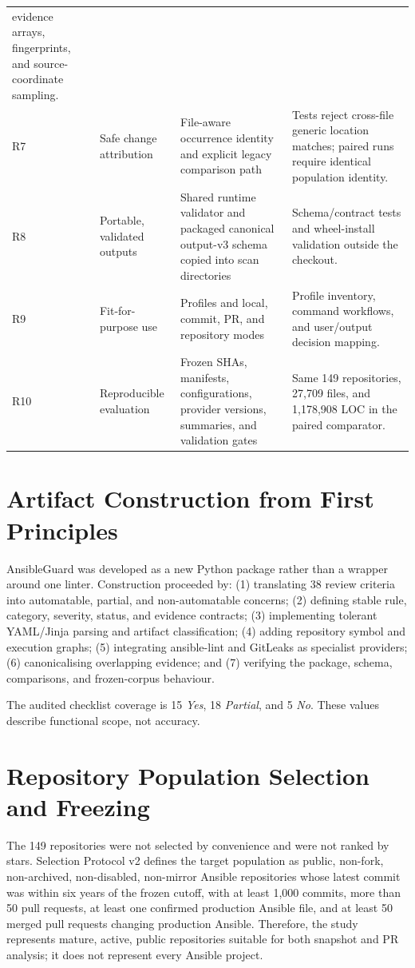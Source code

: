 \begin{longtable}{@{}p{0.8cm}p{3.1cm}p{4.8cm}p{5.0cm}@{}}
evidence arrays, fingerprints, and source-coordinate sampling. \\
R7 & Safe change attribution & File-aware occurrence identity and explicit
legacy comparison path & Tests reject cross-file generic location matches;
paired runs require identical population identity. \\
R8 & Portable, validated outputs & Shared runtime validator and packaged
canonical output-v3 schema copied into scan directories & Schema/contract tests
and wheel-install validation outside the checkout. \\
R9 & Fit-for-purpose use & Profiles and local, commit, PR, and repository modes
& Profile inventory, command workflows, and user/output decision mapping. \\
R10 & Reproducible evaluation & Frozen SHAs, manifests, configurations,
provider versions, summaries, and validation gates & Same 149 repositories,
27,709 files, and 1,178,908 LOC in the paired comparator. \\
\bottomrule
\end{longtable}

\section{Artifact Construction from First Principles}
AnsibleGuard was developed as a new Python package rather than a wrapper around
one linter. Construction proceeded by: (1) translating 38 review criteria into
automatable, partial, and non-automatable concerns; (2) defining stable rule,
category, severity, status, and evidence contracts; (3) implementing tolerant
YAML/Jinja parsing and artifact classification; (4) adding repository symbol
and execution graphs; (5) integrating ansible-lint and GitLeaks as specialist
providers; (6) canonicalising overlapping evidence; and (7) verifying the
package, schema, comparisons, and frozen-corpus behaviour.

The audited checklist coverage is 15 \emph{Yes}, 18 \emph{Partial}, and 5
\emph{No}. These values describe functional scope, not accuracy.

\section{Repository Population Selection and Freezing}
\label{sec:repository_selection}
The 149 repositories were not selected by convenience and were not ranked by
stars. Selection Protocol v2 defines the target population as public,
non-fork, non-archived, non-disabled, non-mirror Ansible repositories whose
latest commit was within six years of the frozen cutoff, with at least 1,000
commits, more than 50 pull requests, at least one confirmed production Ansible
file, and at least 50 merged pull requests changing production Ansible.
Therefore, the study represents mature, active, public repositories suitable
for both snapshot and PR analysis; it does not represent every Ansible project.

